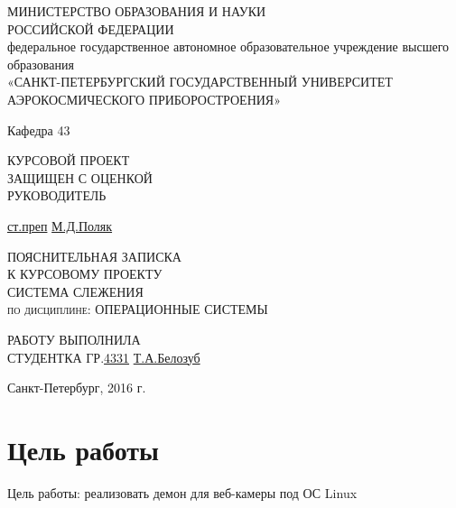 \documentclass[12pt,a4paper]{scrartcl}
\begin{document}
\begin{titlepage}
  \begin{center}
    \large
    МИНИСТЕРСТВО ОБРАЗОВАНИЯ И НАУКИ \\РОССИЙСКОЙ ФЕДЕРАЦИИ\\
    федеральное государственное автономное образовательное учреждение высшего образования\\
    «САНКТ-ПЕТЕРБУРГСКИЙ ГОСУДАРСТВЕННЫЙ УНИВЕРСИТЕТ 
    АЭРОКОСМИЧЕСКОГО ПРИБОРОСТРОЕНИЯ»

    Кафедра 43   
    \end{center}
	\vfill
	\noindent КУРСОВОЙ ПРОЕКТ
    \normalsize{}\\
    \normalsize{ЗАЩИЩЕН С ОЦЕНКОЙ}\\
    \normalsize{РУКОВОДИТЕЛЬ}
    
    \underline{ст.преп}
    \hspace{5cm}
    \underline{\hspace{3cm}}
    \hspace{3cm}
    \underline{М.Д.Поляк}
    \vfill
    
	\begin{center}
	\normalsize{ПОЯСНИТЕЛЬНАЯ ЗАПИСКА}\\
	\normalsize{К КУРСОВОМУ ПРОЕКТУ}\\
	\vfill
	\normalsize{СИСТЕМА СЛЕЖЕНИЯ}\\
	\vfill
    \textsc{по дисциплине: ОПЕРАЦИОННЫЕ СИСТЕМЫ}\\
	\end{center}

	\vfill
	\noindent РАБОТУ ВЫПОЛНИЛА
	\normalsize{}\\  
	\normalsize{СТУДЕНТКА ГР.}\hspace{1cm}\underline{4331}
	\hspace{2cm}
	\underline{\hspace{3cm}}
	\hspace{3cm}
	\underline{Т.А.Белозуб}
\vfill

\begin{center}
  Санкт-Петербург, 2016 г.
\end{center}
\end{titlepage}
\newpage
\tableofcontents %
\newpage
\section{Цель работы}
	\normalsize{Цель работы: реализовать демон для веб-камеры под ОС Linux}
\end{document}
